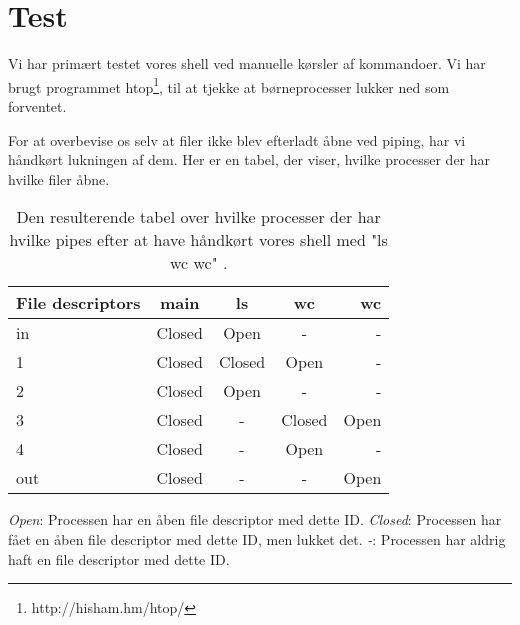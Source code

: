 \section{Test}
Vi har primært testet vores shell ved manuelle kørsler af kommandoer. Vi har brugt programmet htop\footnote{http://hisham.hm/htop/}, til at tjekke at børneprocesser lukker ned som forventet. 

For at overbevise os selv at filer ikke blev efterladt åbne ved piping, har vi håndkørt lukningen af dem.
Her er en tabel, der viser, hvilke processer der har hvilke filer åbne. 

\begin{table}[h]
\centering
\begin{tabular}{ l | c | c | c | r}
File descriptors 	& main 		& ls 		& wc 		& wc \\ \hline
in 	 				& Closed 	& Open 		&  - 		& - \\ \hline
1 	 				& Closed 	& Closed 	& Open 		& - \\ \hline
2 	 				& Closed 	& Open 		& - 		& - \\ \hline
3 	 				& Closed 	& - 		& Closed 	& Open\\ \hline
4 	 				& Closed 	& - 		& Open 		&  -	\\ \hline
out  				& Closed 	& - 		& - 		&  Open
\end{tabular}
\caption{Den resulterende tabel over hvilke processer der har hvilke pipes efter at have håndkørt vores shell med "ls \textbar wc \textbar wc" .}
\label{test-tabel}
\end{table}

 \newline
\textit{Open}: Processen har en åben file descriptor med dette ID. \newline
\textit{Closed}: Processen har fået en åben file descriptor med dette ID, men lukket det.\newline
\textit{-}: Processen har aldrig haft en file descriptor med dette ID.
